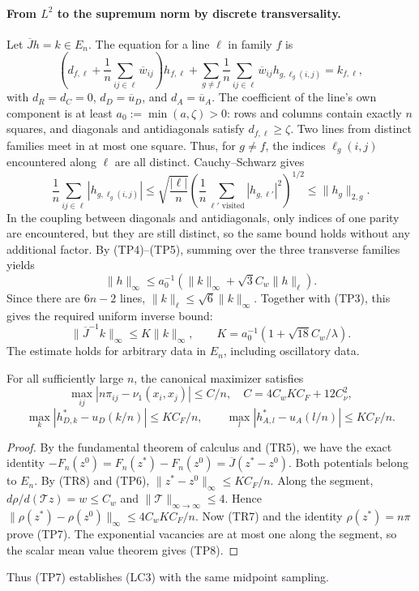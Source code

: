 \paragraph{From $L^2$ to the supremum norm by discrete transversality.}
Let $\overline Jh=k\in E_n$. The equation for a line $\ell$ in family
$f$ is
\[
 \left(d_{f,\ell}+\frac1n\sum_{ij\in\ell}\overline w_{ij}\right)h_{f,\ell}
 +\sum_{g\ne f}\frac1n\sum_{ij\in\ell}\overline w_{ij}h_{g,\ell_g(i,j)}
 =k_{f,\ell},
                                                        \tag{TP4}
\]
with $d_R=d_C=0$, $d_D=\overline u_D$, and $d_A=\overline u_A$.
The coefficient of the line's own component is at least $a_0:=\min(a,\zeta)>0$:
rows and columns contain exactly $n$ squares, and diagonals and antidiagonals satisfy
$d_{f,\ell}\ge\zeta$.
Two lines from distinct families meet in at most one square.
Thus, for $g\ne f$, the indices $\ell_g(i,j)$ encountered along $\ell$
are all distinct. Cauchy--Schwarz gives
\[
 \frac1n\sum_{ij\in\ell}|h_{g,\ell_g(i,j)}|
 \le\sqrt{\frac{|\ell|}{n}}
       \left(\frac1n\sum_{\ell'\text{ visited}}|h_{g,\ell'}|^2\right)^{1/2}
 \le\|h_g\|_{2,g}.
                                                        \tag{TP5}
\]
In the coupling between diagonals and antidiagonals, only indices of one parity are encountered,
but they are still distinct, so the same bound holds without any additional factor.
By (TP4)--(TP5), summing over the three transverse families yields
\[
 \|h\|_\infty\le a_0^{-1}
       (\|k\|_\infty+\sqrt3 C_w\|h\|_\ell).
\]
Since there are $6n-2$ lines, $\|k\|_\ell\le\sqrt6\|k\|_\infty$.
Together with (TP3), this gives the required uniform inverse bound:
\[
 \|\overline J^{-1}k\|_\infty\le K\|k\|_\infty,
 \qquad K=a_0^{-1}(1+\sqrt{18}C_w/\lambda).
                                                        \tag{TP6}
\]
The estimate holds for arbitrary data in $E_n$, including oscillatory data.

\begin{proposicion}
For all sufficiently large $n$, the canonical maximizer satisfies
\[
 \max_{ij}|n\pi_{ij}-\nu_1(x_i,x_j)|\le C/n,
 \quad C=4C_wKC_F+12C_\nu^2,
                                                        \tag{TP7}
\]
\[
 \max_k|h^*_{D,k}-u_D(k/n)|\le KC_F/n,\qquad
 \max_l|h^*_{A,l}-u_A(l/n)|\le KC_F/n.
                                                        \tag{TP8}
\]
\end{proposicion}
\begin{proof}
By the fundamental theorem of calculus and (TR5), we have the exact identity
$-F_n(z^0)=F_n(z^*)-F_n(z^0)=\overline J(z^*-z^0)$.
Both potentials belong to $E_n$. By (TR8) and (TP6),
$\|z^*-z^0\|_\infty\le KC_F/n$.
Along the segment, $d\rho/d(\mathcal Tz)=w\le C_w$ and
$\|\mathcal T\|_{\infty\to\infty}\le4$. Hence
$\|\rho(z^*)-\rho(z^0)\|_\infty\le4C_wKC_F/n$.
Now (TR7) and the identity $\rho(z^*)=n\pi$ prove (TP7).
The exponential vacancies are at most one along the segment,
so the scalar mean value theorem gives (TP8).
\end{proof}

Thus (TP7) establishes (LC3) with the same midpoint sampling.

